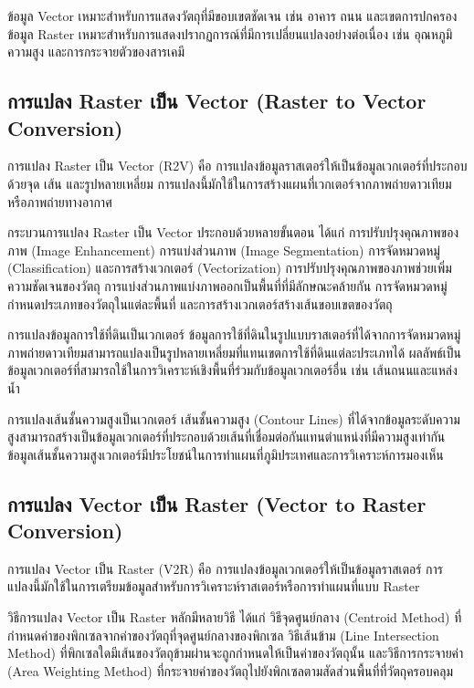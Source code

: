 ข้อมูล Vector เหมาะสำหรับการแสดงวัตถุที่มีขอบเขตชัดเจน เช่น อาคาร ถนน และเขตการปกครอง ข้อมูล Raster เหมาะสำหรับการแสดงปรากฏการณ์ที่มีการเปลี่ยนแปลงอย่างต่อเนื่อง เช่น อุณหภูมิ ความสูง และการกระจายตัวของสารเคมี

\subsection{การแปลง Raster เป็น Vector (Raster to Vector Conversion)}

การแปลง Raster เป็น Vector (R2V) คือ การแปลงข้อมูลราสเตอร์ให้เป็นข้อมูลเวกเตอร์ที่ประกอบด้วยจุด เส้น และรูปหลายเหลี่ยม การแปลงนี้มักใช้ในการสร้างแผนที่เวกเตอร์จากภาพถ่ายดาวเทียมหรือภาพถ่ายทางอากาศ

กระบวนการแปลง Raster เป็น Vector ประกอบด้วยหลายขั้นตอน ได้แก่ การปรับปรุงคุณภาพของภาพ (Image Enhancement) การแบ่งส่วนภาพ (Image Segmentation) การจัดหมวดหมู่ (Classification) และการสร้างเวกเตอร์ (Vectorization) การปรับปรุงคุณภาพของภาพช่วยเพิ่มความชัดเจนของวัตถุ การแบ่งส่วนภาพแบ่งภาพออกเป็นพื้นที่ที่มีลักษณะคล้ายกัน การจัดหมวดหมู่กำหนดประเภทของวัตถุในแต่ละพื้นที่ และการสร้างเวกเตอร์สร้างเส้นขอบเขตของวัตถุ

\begin{ex}
การแปลงข้อมูลการใช้ที่ดินเป็นเวกเตอร์ ข้อมูลการใช้ที่ดินในรูปแบบราสเตอร์ที่ได้จากการจัดหมวดหมู่ภาพถ่ายดาวเทียมสามารถแปลงเป็นรูปหลายเหลี่ยมที่แทนเขตการใช้ที่ดินแต่ละประเภทได้ ผลลัพธ์เป็นข้อมูลเวกเตอร์ที่สามารถใช้ในการวิเคราะห์เชิงพื้นที่ร่วมกับข้อมูลเวกเตอร์อื่น เช่น เส้นถนนและแหล่งน้ำ
\end{ex}

\begin{ex}
การแปลงเส้นชั้นความสูงเป็นเวกเตอร์ เส้นชั้นความสูง (Contour Lines) ที่ได้จากข้อมูลระดับความสูงสามารถสร้างเป็นข้อมูลเวกเตอร์ที่ประกอบด้วยเส้นที่เชื่อมต่อกันแทนตำแหน่งที่มีความสูงเท่ากัน ข้อมูลเส้นชั้นความสูงเวกเตอร์มีประโยชน์ในการทำแผนที่ภูมิประเทศและการวิเคราะห์การมองเห็น
\end{ex}

\subsection{การแปลง Vector เป็น Raster (Vector to Raster Conversion)}

การแปลง Vector เป็น Raster (V2R) คือ การแปลงข้อมูลเวกเตอร์ให้เป็นข้อมูลราสเตอร์ การแปลงนี้มักใช้ในการเตรียมข้อมูลสำหรับการวิเคราะห์ราสเตอร์หรือการทำแผนที่แบบ Raster

วิธีการแปลง Vector เป็น Raster หลักมีหลายวิธี ได้แก่ วิธีจุดศูนย์กลาง (Centroid Method) ที่กำหนดค่าของพิกเซลจากค่าของวัตถุที่จุดศูนย์กลางของพิกเซล วิธีเส้นข้าม (Line Intersection Method) ที่พิกเซลใดมีเส้นของวัตถุข้ามผ่านจะถูกกำหนดให้เป็นค่าของวัตถุนั้น และวิธีการกระจายค่า (Area Weighting Method) ที่กระจายค่าของวัตถุไปยังพิกเซลตามสัดส่วนพื้นที่ที่วัตถุครอบคลุม

